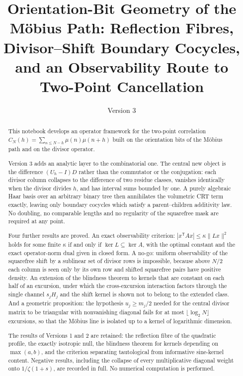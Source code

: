 \documentclass[11pt]{amsart}
\title{
Orientation-Bit Geometry of the M\"obius Path:
Reflection Fibres, Divisor--Shift Boundary Cocycles,
and an Observability Route to Two-Point Cancellation
}
\author{}
\date{Version 3}
\numberwithin{equation}{section}
\theoremstyle{plain}
\theoremstyle{definition}
\theoremstyle{remark}
\begin{document}
\begin{abstract}
This notebook develops an operator framework for the two-point
correlation $C_N(h)=\sum_{n\le N-h}\mu(n)\mu(n+h)$ built on the
orientation bits of the M\"obius path and on the divisor operator.

Version 3 adds an analytic layer to the combinatorial one. The central
new object is the difference $(U_h-I)D$ rather than the commutator or
the conjugation: each divisor column collapses to the difference of two
residue classes, vanishes identically when the divisor divides $h$, and
has interval sums bounded by one. A purely algebraic Haar basis over an
arbitrary binary tree then annihilates the volumetric CRT term exactly,
leaving only boundary cocycles which satisfy a parent--children additivity
law. No doubling, no comparable lengths and no regularity of the
squarefree mask are required at any point.

Four further results are proved. An exact observability criterion:
$|x^{\mathsf T}Ax|\le\kappa\|Lx\|^2$ holds for some finite $\kappa$ if
and only if $\ker L\subseteq\ker A$, with the optimal constant and the
exact operator-norm dual given in closed form. A no-go: uniform
observability of the squarefree shift by a sublinear set of divisor rows
is impossible, because above $N/2$ each column is seen only by its own
row and shifted squarefree pairs have positive density. An extension of
the blindness theorem to kernels that are constant on each half of an
excursion, under which the cross-excursion interaction factors through
the single channel $s_jH_j$ and the shift kernel is shown not to belong
to the extended class. And a geometric proposition: the hypothesis
$u_j\ge m_j/2$ needed for the central divisor matrix to be triangular
with nonvanishing diagonal fails for at most $\lfloor\log_2 N\rfloor$
excursions, so that the M\"obius line is isolated up to a kernel of
logarithmic dimension.

The results of Versions 1 and 2 are retained: the reflection fibre of
the quadratic profile, the exactly isotropic null, the blindness theorem
for kernels depending on $\max(a,b)$, and the criterion separating
tautological from informative sine-kernel content. Negative results,
including the collapse of every multiplicative diagonal weight onto
$1/\zeta(1+s)$, are recorded in full. No numerical computation is
performed.
\end{abstract}

\maketitle
\end{document}
